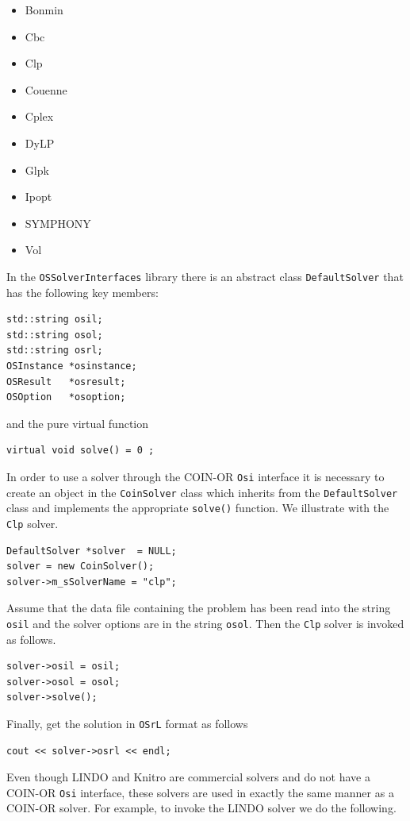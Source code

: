 \documentclass[11pt]{article}
\renewcommand{\_}{{\char"5F}}
\renewcommand{\{}{{\char"7B}}
\renewcommand{\}}{{\char"7D}}
\renewcommand{\^}{{\char"0D}}
\renewcommand{\'}{{\char"0D}}
\newif\ifknitro \knitrofalse    %
\begin{document}
\begin{enumerate}[Step 1:]
\begin{itemize}
\item Bonmin
\item Cbc
\item Clp
\item Couenne
\item Cplex
\item DyLP
\item Glpk
\item Ipopt
\item SYMPHONY
\item Vol
\end{itemize}

In the {\tt OSSolverInterfaces} library there is an abstract class
{\tt DefaultSolver} that has the following key members:

\begin{verbatim}
std::string osil;
std::string osol;
std::string osrl;
OSInstance *osinstance;
OSResult   *osresult;
OSOption   *osoption;
\end{verbatim}
and the pure virtual function
\begin{verbatim}
virtual void solve() = 0 ;
\end{verbatim}
In order to use a solver through the COIN-OR {\tt Osi} interface it is
necessary to create an object in the {\tt CoinSolver} class which inherits
from the {\tt DefaultSolver} class and implements the appropriate
{\tt solve()} function.  We illustrate with the {\tt Clp} solver.

\begin{verbatim}
DefaultSolver *solver  = NULL;
solver = new CoinSolver();
solver->m_sSolverName = "clp";
\end{verbatim}

Assume that the data file containing the problem has been read into
the string {\tt osil} and the solver options are in the string {\tt osol}.
Then the {\tt Clp} solver is invoked as follows.

\begin{verbatim}
solver->osil = osil;
solver->osol = osol;
solver->solve();
\end{verbatim}

Finally, get the solution in {\tt OSrL} format as follows

\begin{verbatim}
cout << solver->osrl << endl;
\end{verbatim}

\ifknitro   %
Even though LINDO and Knitro are commercial solvers and do not have a COIN-OR {\tt Osi} interface, these solvers are
used in exactly the same manner as a COIN-OR solver. For example, to invoke the LINDO solver we do the following.


\end{enumerate}
\end{document}
